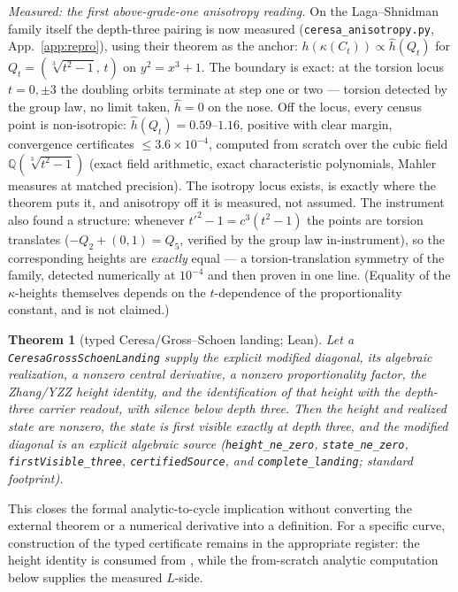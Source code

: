 \documentclass[11pt]{article}
\newtheorem{theorem}{Theorem}[section]
\theoremstyle{definition}
\theoremstyle{remark}
\begin{document}
\noindent\emph{Measured: the first above-grade-one anisotropy reading.} On the
Laga--Shnidman family itself the depth-three pairing is now measured
(\texttt{ceresa\_anisotropy.py}, App.~\ref{app:repro}), using their theorem as
the anchor: $h(\kappa(C_t))\propto\hat h(Q_t)$ for
$Q_t=(\sqrt[3]{t^2-1},\,t)$ on $y^2=x^3+1$. The boundary is exact: at the
torsion locus $t=0,\pm3$ the doubling orbits terminate at step one or two ---
torsion detected by the group law, no limit taken, $\hat h=0$ on the nose. Off
the locus, every census point is non-isotropic: $\hat h(Q_t)=0.59$--$1.16$,
positive with clear margin, convergence certificates $\le3.6\times10^{-4}$,
computed from scratch over the cubic field $\mathbb Q(\sqrt[3]{t^2-1})$ (exact
field arithmetic, exact characteristic polynomials, Mahler measures at matched
precision). The isotropy locus exists, is exactly where the theorem puts it,
and anisotropy off it is measured, not assumed. The instrument also found a
structure: whenever $t'^2-1=c^3(t^2-1)$ the points are torsion translates
($-Q_2+(0,1)=Q_5$, verified by the group law in-instrument), so the
corresponding heights are \emph{exactly} equal --- a torsion-translation
symmetry of the family, detected numerically at $10^{-4}$ and then proven in
one line. (Equality of the $\kappa$-heights themselves depends on the
$t$-dependence of the proportionality constant, and is not claimed.)

\begin{theorem}[typed Ceresa/Gross--Schoen landing; Lean]\label{tgt:ceresa}
Let a \texttt{CeresaGrossSchoenLanding} supply the explicit modified diagonal,
its algebraic realization, a nonzero central derivative, a nonzero
proportionality factor, the Zhang/YZZ height identity, and the identification
of that height with the depth-three carrier readout, with silence below depth
three. Then the height and realized state are nonzero, the state is first
visible exactly at depth three, and the modified diagonal is an explicit
algebraic source
(\texttt{height\_ne\_zero}, \texttt{state\_ne\_zero},
\texttt{firstVisible\_three}, \texttt{certifiedSource}, and
\texttt{complete\_landing}; standard footprint).
\end{theorem}

This closes the formal analytic-to-cycle implication without converting the
external theorem or a numerical derivative into a definition. For a specific
curve, construction of the typed certificate remains in the appropriate
register: the height identity is consumed from \cite{ZhangGS,YZZ}, while the
from-scratch analytic computation below supplies the measured $L$-side.
\end{document}
